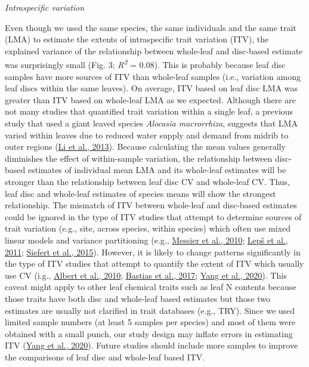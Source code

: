 \documentclass[
  12pt,
  a4paper,
,tablecaptionabove
]{scrartcl}
\begin{document}
\emph{Intraspecific variation}

Even though we used the same species, the same individuals and the same trait (LMA) to estimate the extents of intraspecific trait variation (ITV), the explained variance of the relationship between whole-leaf and disc-based estimate was surprisingly small (Fig. 3; \emph{R\textsuperscript{2}} = 0.08).
This is probably because leaf disc samples have more sources of ITV than whole-leaf samples (i.e., variation among leaf discs within the same leaves).
On average, ITV based on leaf disc LMA was greater than ITV based on whole-leaf LMA as we expected.
Although there are not many studies that quantified trait variation within a single leaf, a previous study that used a giant leaved species \emph{Alocasia macrorrhiza}, suggests that LMA varied within leaves due to reduced water supply and demand from midrib to outer regions (\protect\hyperlink{ref-Li2013a}{Li et al., 2013}).
Because calculating the mean values generally diminishes the effect of within-sample variation, the relationship between disc-based estimates of individual mean LMA and its whole-leaf estimates will be stronger than the relationship between leaf disc CV and whole-leaf CV.
Thus, leaf disc and whole-leaf estimates of species means will show the strongest relationship.
The mismatch of ITV between whole-leaf and disc-based estimates could be ignored in the type of ITV studies that attempt to determine sources of trait variation (e.g., site, across species, within species) which often use mixed linear models and variance partitioning (e.g., \protect\hyperlink{ref-Messier2010}{Messier et al., 2010}; \protect\hyperlink{ref-Leps2011}{Lepš et al., 2011}; \protect\hyperlink{ref-Siefert2015}{Siefert et al., 2015}).
However, it is likely to change patterns significantly in the type of ITV studies that attempt to quantify the extent of ITV which usually use CV (i.g., \protect\hyperlink{ref-Albert2010a}{Albert et al., 2010}; \protect\hyperlink{ref-Bastias2017a}{Bastias et al., 2017}; \protect\hyperlink{ref-Yang2020}{Yang et al., 2020}).
This caveat might apply to other leaf chemical traits such as leaf N contents because those traits have both disc and whole-leaf based estimates but those two estimates are usually not clarified in trait databases (e.g., TRY).
Since we used limited sample numbers (at least 5 samples per species) and most of them were obtained with a small punch, our study design may inflate errors in estimating ITV (\protect\hyperlink{ref-Yang2020}{Yang et al., 2020}).
Future studies should include more samples to improve the comparisons of leaf disc and whole-leaf based ITV.
\end{document}
